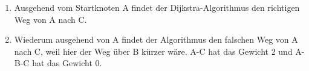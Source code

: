 \documentclass[a4paper, 12pt, margins=3cm]{homework}
\begin{document}
  \begin{problem}

  \end{problem}
  \begin{solution}\hfill
    \begin{enumerate}[label=\alph*)]\itemsep0pt
      \item \hfill
        \begin{center}
        \end{center}
        Ausgehend vom Startknoten A findet der Dijkstra-Algorithmus den richtigen
        Weg von A nach C. 
        \newpage
      \item \hfill
        \begin{center}
        \end{center}
        Wiederum ausgehend von A findet der Algorithmus den falschen Weg von A
        nach C, weil hier der Weg über B kürzer wäre. A-C hat das Gewicht 2 und 
        A-B-C hat das Gewicht 0.
    \end{enumerate}
  \end{solution}


  \begin{problem}
    
  \end{problem}
  \begin{solution}
    
  \end{solution}
\end{document}
